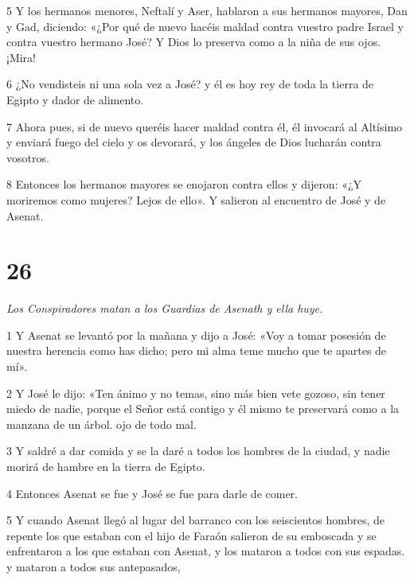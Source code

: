\par 5 Y los hermanos menores, Neftalí y Aser, hablaron a sus hermanos mayores, Dan y Gad, diciendo: «¿Por qué de nuevo hacéis maldad contra vuestro padre Israel y contra vuestro hermano José? Y Dios lo preserva como a la niña de sus ojos. ¡Mira!

\par 6 ¿No vendisteis ni una sola vez a José? y él es hoy rey ​​de toda la tierra de Egipto y dador de alimento.

\par 7 Ahora pues, si de nuevo queréis hacer maldad contra él, él invocará al Altísimo y enviará fuego del cielo y os devorará, y los ángeles de Dios lucharán contra vosotros.

\par 8 Entonces los hermanos mayores se enojaron contra ellos y dijeron: «¿Y moriremos como mujeres? Lejos de ello». Y salieron al encuentro de José y de Asenat.

\chapter{26}

\par \textit{Los Conspiradores matan a los Guardias de Asenath y ella huye.}


\par 1 Y Asenat se levantó por la mañana y dijo a José: «Voy a tomar posesión de nuestra herencia como has dicho; pero mi alma teme mucho que te apartes de mí».

\par 2 Y José le dijo: «Ten ánimo y no temas, sino más bien vete gozoso, sin tener miedo de nadie, porque el Señor está contigo y él mismo te preservará como a la manzana de un árbol. ojo de todo mal.

\par 3 Y saldré a dar comida y se la daré a todos los hombres de la ciudad, y nadie morirá de hambre en la tierra de Egipto.

\par 4 Entonces Asenat se fue y José se fue para darle de comer.

\par 5 Y cuando Asenat llegó al lugar del barranco con los seiscientos hombres, de repente los que estaban con el hijo de Faraón salieron de su emboscada y se enfrentaron a los que estaban con Asenat, y los mataron a todos con sus espadas. y mataron a todos sus antepasados,

